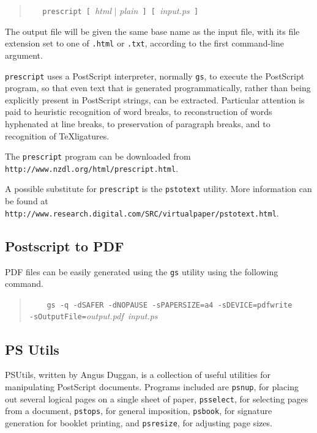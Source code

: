 \documentclass[twoside,11pt]{article}
\newcommand{\htmladdnormallink}[2]{#1}
\newcommand{\htmlref}[2]{#1}
\newcommand{\latex}[1]{#1}
\newcommand{\xlabel}[1]{}
\begin{document}
\begin{quote}
\verb+   prescript [ +{\em html} $\mid$ {\em plain}\verb+ ] [ +{\em input.ps}\verb+ ]+
\end{quote}

The output file will be given the same base name as the input file, with its file extension set to one of {\tt .html} or {\tt .txt}, according to the first command-line argument. 

{\tt prescript} uses a PostScript interpreter, normally \htmlref{{\tt gs}}{sc15_gs}, to execute the PostScript program, so that even text that is generated programmatically, rather than being explicitly present in PostScript strings, can be extracted. Particular attention is paid to heuristic recognition of word breaks, to reconstruction of words hyphenated at line breaks, to preservation of paragraph breaks, and to recognition of \TeX ligatures. 

The {\tt prescript} program can be downloaded from \htmladdnormallink{{\tt http://www.nzdl.org/html/prescript.html}}{http://www.nzdl.org/html/prescript.html}.

A possible substitute for {\tt prescript} is the \htmladdnormallink{{\tt pstotext}}{http://www.research.digital.com/SRC/virtualpaper/pstotext.html} utility. \latex{ More information can be found at {\tt http://www.research.digital.com/SRC/virtualpaper/pstotext.html}.} 

\subsection{\xlabel{sc15_pstopdf}Postscript to PDF\label{sc15_pstopdf}}

PDF files can be easily generated using the \htmlref{{\tt gs}}{sc15_gs} utility using the following command.

\begin{quote}
\verb+    gs -q -dSAFER -dNOPAUSE -sPAPERSIZE=a4 -sDEVICE=pdfwrite+\linebreak
\verb+       -sOutputFile=+{\em output.pdf}\verb+ +{\em input.ps}
\end{quote}

\subsection{\xlabel{sc15_pstools}PS Utils\label{sc15_pstools}}

\htmladdnormallink{PSUtils}{http://www.dcs.ed.ac.uk/home/ajcd/psutils/index.html}, written by Angus Duggan, is a collection of useful utilities for manipulating PostScript documents. Programs included are {\tt psnup}, for placing out several logical pages on a single sheet of paper, {\tt psselect}, for selecting pages from a document, {\tt pstops}, for general imposition, {\tt psbook}, for signature generation for booklet printing, and {\tt psresize}, for adjusting page sizes. 
\end{document}
